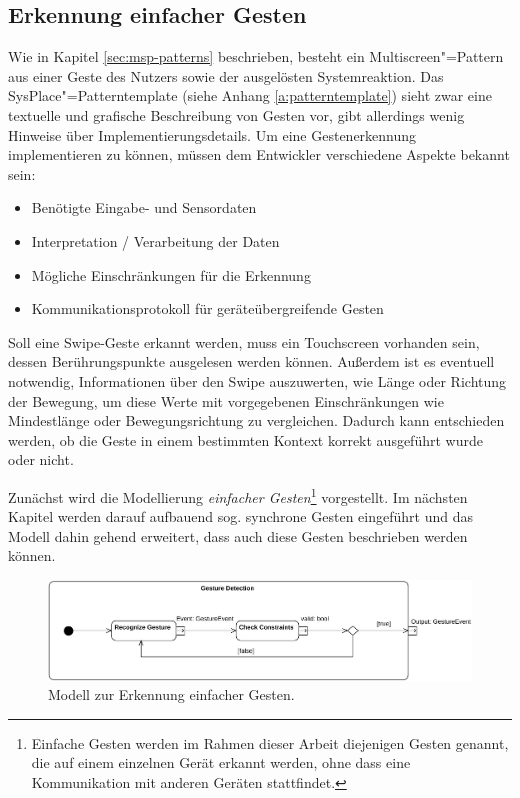 \subsection{Erkennung einfacher Gesten}
\label{subsec:simple_gesture}
Wie in Kapitel \ref{sec:msp-patterns} beschrieben, besteht ein Multiscreen"=Pattern  aus einer Geste des Nutzers sowie der ausgelösten Systemreaktion. Das SysPlace"=Patterntemplate (siehe Anhang \ref{a:patterntemplate}) sieht zwar eine textuelle und grafische Beschreibung von Gesten vor, gibt allerdings wenig Hinweise über Implementierungsdetails. Um eine Gestenerkennung implementieren zu können, müssen dem Entwickler verschiedene Aspekte bekannt sein:
\begin{itemize}
\item Benötigte Eingabe- und Sensordaten
\item Interpretation / Verarbeitung der Daten
\item Mögliche Einschränkungen für die Erkennung
\item Kommunikationsprotokoll für geräteübergreifende Gesten
\end{itemize}
Soll \zb eine Swipe-Geste erkannt werden, muss ein Touchscreen vorhanden sein, dessen Berührungspunkte ausgelesen werden können. Außerdem ist es eventuell notwendig, Informationen über den Swipe auszuwerten, wie \zb Länge oder Richtung der Bewegung, um diese Werte mit vorgegebenen Einschränkungen wie Mindestlänge oder Bewegungsrichtung zu vergleichen. Dadurch kann entschieden werden, ob die Geste in einem bestimmten Kontext korrekt ausgeführt wurde oder nicht.

Zunächst wird die Modellierung \textit{einfacher Gesten}\footnote{Einfache Gesten werden im Rahmen dieser Arbeit diejenigen Gesten genannt, die auf einem einzelnen Gerät erkannt werden, ohne dass eine Kommunikation mit anderen Geräten stattfindet.} vorgestellt. Im nächsten Kapitel werden darauf aufbauend sog. synchrone Gesten eingeführt und das Modell dahin gehend erweitert, dass auch diese Gesten beschrieben werden können.
\begin{figure}[h]
\centering
\includegraphics[width=1\textwidth]{bilder/gesture_detection.pdf}
\caption{Modell zur Erkennung einfacher Gesten.}
\label{fig:gesture_detection}
\end{figure}

